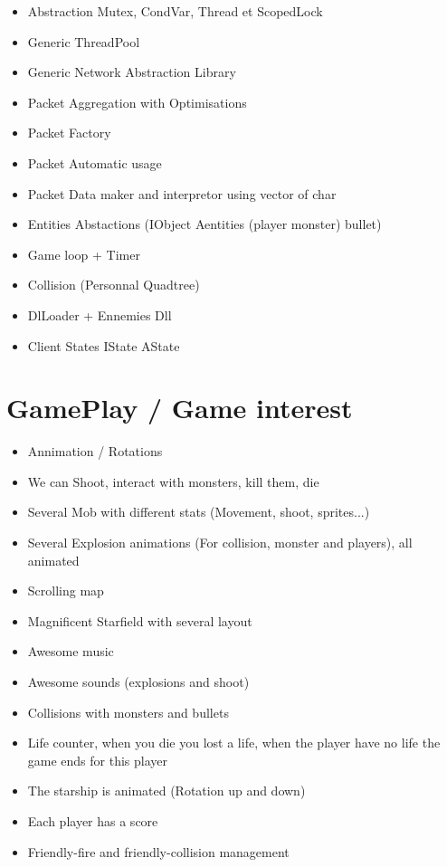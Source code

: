\documentclass{koala-fr}
\begin{document}
\begin{itemize}
  \item Abstraction Mutex, CondVar, Thread et ScopedLock
  \item Generic ThreadPool
  \item Generic Network Abstraction Library
  \item Packet Aggregation with Optimisations
  \item Packet Factory
  \item Packet Automatic usage
  \item Packet Data maker and interpretor using vector of char
  \item Entities Abstactions (IObject Aentities (player monster) bullet)
  \item Game loop + Timer
  \item Collision (Personnal Quadtree)
  \item DlLoader + Ennemies Dll
  \item Client States IState AState
\end{itemize}

\newpage

\section{GamePlay / Game interest}

\begin{itemize}
  \item Annimation / Rotations
  \item We can Shoot, interact with monsters, kill them, die
  \item Several Mob with different stats (Movement, shoot, sprites...)
  \item Several Explosion animations (For collision, monster and players), all animated
  \item Scrolling map
  \item Magnificent Starfield with several layout 
  \item Awesome music
  \item Awesome sounds (explosions and shoot)
  \item Collisions with monsters and bullets
  \item Life counter, when you die you lost a life, when the player have no life the game ends for this player
  \item The starship is animated (Rotation up and down)
  \item Each player has a score
  \item Friendly-fire and friendly-collision management
\end{itemize}
\end{document}

